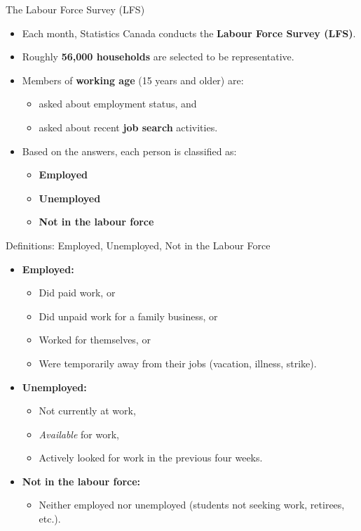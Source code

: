 \documentclass[aspectratio=169]{beamer}
\begin{document}
\begin{frame}{The Labour Force Survey (LFS)}
\transfade
\begin{itemize}[<+->]
  \item Each month, Statistics Canada conducts the \textbf{Labour Force Survey (LFS)}.
  \item Roughly \textbf{56,000 households} are selected to be representative.
  \item Members of \textbf{working age} (15 years and older) are:
  \begin{itemize}[<+->]
    \item asked about employment status, and
    \item asked about recent \textbf{job search} activities.
  \end{itemize}
  \item Based on the answers, each person is classified as:
  \begin{itemize}[<+->]
    \item \textbf{Employed}
    \item \textbf{Unemployed}
    \item \textbf{Not in the labour force}
  \end{itemize}
\end{itemize}
\end{frame}

\begin{frame}{Definitions: Employed, Unemployed, Not in the Labour Force}
\transfade
\begin{itemize}[<+->]
  \item \textbf{Employed:}
  \begin{itemize}[<+->]
    \item Did paid work, or
    \item Did unpaid work for a family business, or
    \item Worked for themselves, or
    \item Were temporarily away from their jobs (vacation, illness, strike).
  \end{itemize}
  \item \textbf{Unemployed:}
  \begin{itemize}[<+->]
    \item Not currently at work,
    \item \emph{Available} for work,
    \item Actively looked for work in the previous four weeks.
  \end{itemize}
  \item \textbf{Not in the labour force:}
  \begin{itemize}[<+->]
    \item Neither employed nor unemployed (students not seeking work, retirees, etc.).
  \end{itemize}
\end{itemize}
\end{frame}
\end{document}
